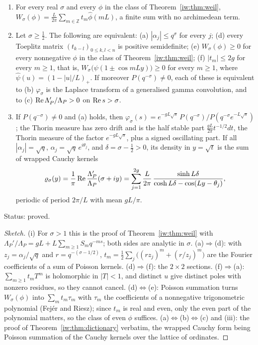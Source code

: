 \begin{theorem}\label{iw:thm:curves}
\begin{enumerate}
\item[(i)] For every real $\sigma$ and every $\phi$ in the class of Theorem~\ref{iw:thm:weil}, $W_\sigma(\phi)=\frac L{2\pi}\sum_{m\in\mathbb Z}t_m\widehat\phi(mL)$, a finite sum with no archimedean term.
\item[(ii)] Let $\sigma\ge\frac12$. The following are equivalent: (a) $|\alpha_j|\le q^\sigma$ for every $j$; (d) every Toeplitz matrix $(t_{k-l})_{0\le k,l<n}$ is positive semidefinite; (e) $W_\sigma(\phi)\ge0$ for every nonnegative $\phi$ in the class of Theorem~\ref{iw:thm:weil}; (f) $|t_m|\le2g$ for every $m\ge1$, that is, $W_\sigma\big(\psi(1\pm\cos mLy)\big)\ge0$ for every $m\ge1$, where $\widehat\psi(u)=(1-|u|/L)_+$. If moreover $P(q^{-\sigma})\ne0$, each of these is equivalent to (b) $\varphi_\sigma$ is the Laplace transform of a generalised gamma convolution, and to (c) $\operatorname{Re}\Lambda_P'/\Lambda_P>0$ on $\operatorname{Re} s>\sigma$.
\item[(iii)] If $P(q^{-\sigma})\ne0$ and (a) holds, then $\varphi_\sigma(s)=e^{-gL\sqrt s}\,P(q^{-\sigma})/P(q^{-\sigma}e^{-L\sqrt s})$; the Thorin measure has zero drift and is the half stable part $\frac{gL}{2\pi}t^{-1/2}dt$, the Thorin measure of the factor $e^{-gL\sqrt s}$, plus a signed oscillating part. If all $|\alpha_j|=\sqrt q$, $\alpha_j=\sqrt q\,e^{i\theta_j}$, and $\delta=\sigma-\frac12>0$, its density in $y=\sqrt t$ is the sum of wrapped Cauchy kernels
\[
\varrho_\sigma(y)=\frac1\pi\operatorname{Re}\frac{\Lambda_P'}{\Lambda_P}(\sigma+iy)=\sum_{j=1}^{2g}\frac L{2\pi}\,\frac{\sinh L\delta}{\cosh L\delta-\cos(Ly-\theta_j)},
\]
periodic of period $2\pi/L$ with mean $gL/\pi$.
\end{enumerate}
Status: proved.
\end{theorem}

\begin{proof}[Sketch]
(i) For $\sigma>1$ this is the proof of Theorem~\ref{iw:thm:weil} with $\Lambda_P'/\Lambda_P=gL+L\sum_{m\ge1}S_mq^{-ms}$; both sides are analytic in $\sigma$. (a)$\Rightarrow$(d): with $z_j=\alpha_j/\sqrt q$ and $r=q^{-(\sigma-1/2)}$, $t_m=\frac12\sum_j\big((rz_j)^m+(r/z_j)^m\big)$ are the Fourier coefficients of a sum of Poisson kernels. (d)$\Rightarrow$(f): the $2\times2$ sections. (f)$\Rightarrow$(a): $\sum_{m\ge1}t_mT^m$ is holomorphic in $|T|<1$, and distinct $u$ give distinct poles with nonzero residues, so they cannot cancel. (d)$\Leftrightarrow$(e): Poisson summation turns $W_\sigma(\phi)$ into $\sum_mt_m\tau_m$ with $\tau_m$ the coefficients of a nonnegative trigonometric polynomial (Fej\'er and Riesz); since $t_m$ is real and even, only the even part of the polynomial matters, so the class of even $\phi$ suffices. (a)$\Leftrightarrow$(b)$\Leftrightarrow$(c) and (iii): the proof of Theorem~\ref{iw:thm:dictionary} verbatim, the wrapped Cauchy form being Poisson summation of the Cauchy kernels over the lattice of ordinates.
\end{proof}

